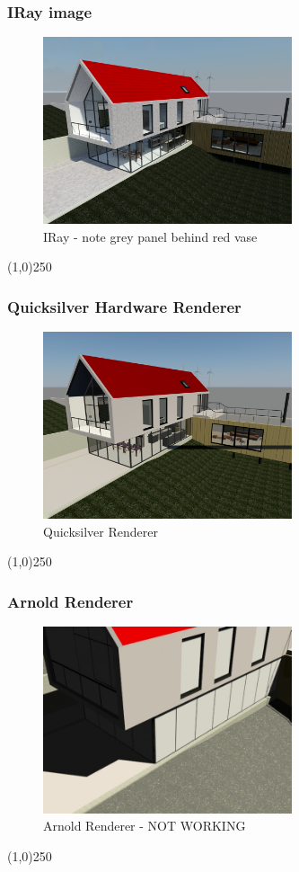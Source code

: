 \begin{frame}
\frametitle{IRay image}
\begin{figure}
	\centering
		\includegraphics[height=5.5cm]{img/Rendering/IRay.jpg}
	\caption{IRay - note grey panel behind red vase}
	\label{fig:IRay}
\end{figure}
\end{frame}
\begin{center}\line(1,0){250}\end{center}


\begin{frame}
\frametitle{Quicksilver Hardware Renderer}
\begin{figure}
	\centering
	\includegraphics[height=5.5cm]{img/Rendering/QuickSilver.jpg}
	\caption{Quicksilver Renderer}
	\label{fig:QuickSilver}
\end{figure}
\end{frame}
\begin{center}\line(1,0){250}\end{center}


\begin{frame}
\frametitle{Arnold Renderer}
\begin{figure}
	\centering
	\includegraphics[height=5.5cm]{img/RenderEngine/Revit3DSScanLine.jpg}
	\caption{Arnold Renderer - NOT WORKING}
	\label{fig:ArnoldRenderer}
\end{figure}
\end{frame}
\begin{center}\line(1,0){250}\end{center}


